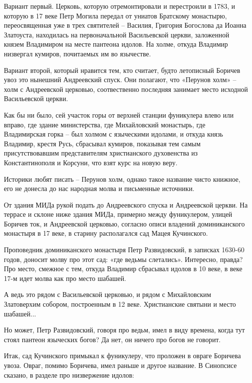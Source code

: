 \documentclass[a5paper,11pt,openany]{article}
\begin{document}
Вариант первый. Церковь, которую отремонтировали и перестроили в 1783, и которую в 17 веке Петр Могила передал от униатов Братскому монастырю, переосвященная уже в трех святителей – Василия, Григория Богослова да Иоанна Златоуста, находилась на первоначальной Васильевской церкви, заложенной князем Владимиром на месте пантеона идолов. На холме, откуда Владимир низвергал кумиров, почитаемых им во язычестве.

Вариант второй, который нравится тем, кто считает, будто летописный Боричев увоз это нынешний Андреевский спуск. Они полагают, что «Перунов холм» – холм с Андреевской церковью, соотвественно последняя занимает место исходной Васильевской церкви.

Как бы ни было, сей участок горы от верхней станции фуникулера влево или вправо, где здание министерства, где Михайловский монастырь, где Владимирская горка – был холмом с языческими идолами, и откуда князь Владимир, крестя Русь, сбрасывал кумиров, показывая тем самым присутствовавшим представителям христианского духовенства из Константинополя и Корсуни, что взят курс на новую веру.

Историки любят писать – Перунов холм, однако такое название чисто книжное, его не донесла до нас народная молва и письменные источники.

От здания МИДа рукой подать до Андреевского спуска и Андреевской церкви. На террасе и склоне ниже здания МИДа, примерно между фуникулером, улицей Боричев ток, и Андреевской церковью, согласно описи владений доминиканского монастыря в 17 веке, в старину располагался сад Мацея Кучинского.

Проповедник доминиканского монастыря Петр Развидовский, в записках 1630-60 годов\cite{sbornikmat}, доносит молву про этот сад: «где ведьмы слетались». Интересно, правда? Про место, смежное с тем, откуда Владимир сбрасывал идолов в 10 веке, в веке 17-м идет молва как про место шабашей.

А ведь это рядом с Васильевской церковью, и рядом с Михайловским Златоверхим собором, построенным в 12 веке. Христианские святыни и место шабашей...

Но может, Петр Развидовский, говоря про ведьм, имел в виду времена, когда тут стоял пантеон языческих богов? Да нет, он ничего про богов не говорит.

Итак, сад Кучинского примыкал к фуникулеру, что проложен в овраге Боричева увоза. Овраг, помимо Боричева, имел раньше и другое название. В Синопсисе сказано, в разделе про низвержение идолов:
\end{document}
